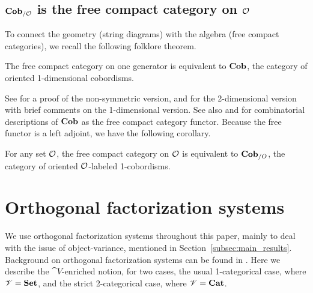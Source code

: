 \documentclass[12pt,oneside,article,draft]{memoir}
\begin{document}
\subsection{$\mathbf{Cob}_{/\mathcal{O}}$ is the free compact category on $\mathcal{O}$}

To connect the geometry (string diagrams) with the algebra (free compact categories), we recall the following folklore theorem. 

\begin{theorem}
The free compact category on one generator is equivalent to $\mathbf{Cob}$, the category of oriented 1-dimensional cobordisms.
\end{theorem}

See \cite[Theorem 3.6]{FreydYetter} for a proof of the non-symmetric version, \cite{Kock} and \cite{BaezDolan} for the 2-dimensional version with brief comments on the 1-dimensional version. See also \cite{KellyLaplaza} and \cite{Abramsky2} for combinatorial descriptions of $\mathbf{Cob}$ as the free compact category functor.  Because the free functor is a left adjoint, we have the following corollary.

\begin{corollary}\label{cor:free_compact_is_Cob}

For any set $\mathcal{O}$, the free compact category on $\mathcal{O}$ is equivalent to $\mathbf{Cob}_{/O}$, the category of oriented $\mathcal{O}$-labeled 1-cobordisms. 

\end{corollary}


\section{Orthogonal factorization systems}

We use orthogonal factorization systems throughout this paper, mainly to deal with the issue of object-variance, mentioned in Section~\ref{subsec:main_results}. Background on orthogonal factorization systems can be found in \cite[Chapter 5.5]{BorceuxV1}. Here we describe the $\cat{V}$-enriched notion, for two cases, the usual 1-categorical case, where $\mathscr{V}=\mathbf{Set}$, and the strict 2-categorical case, where $\mathscr{V}=\mathbf{Cat}$.
\end{document}
